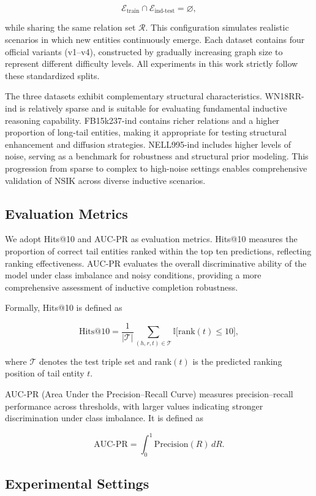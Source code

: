 \documentclass[preprint,12pt]{elsarticle}
\begin{document}
\[
\mathcal{E}_{\text{train}} \cap \mathcal{E}_{\text{ind-test}} = \varnothing,
\]

while sharing the same relation set $\mathcal{R}$. This configuration simulates realistic scenarios in which new entities continuously emerge. Each dataset contains four official variants (v1--v4), constructed by gradually increasing graph size to represent different difficulty levels. All experiments in this work strictly follow these standardized splits.

The three datasets exhibit complementary structural characteristics. WN18RR-ind is relatively sparse and is suitable for evaluating fundamental inductive reasoning capability. FB15k237-ind contains richer relations and a higher proportion of long-tail entities, making it appropriate for testing structural enhancement and diffusion strategies. NELL995-ind includes higher levels of noise, serving as a benchmark for robustness and structural prior modeling. This progression from sparse to complex to high-noise settings enables comprehensive validation of NSIK across diverse inductive scenarios.

\subsection{Evaluation Metrics}

We adopt Hits@10 and AUC-PR as evaluation metrics. Hits@10 measures the proportion of correct tail entities ranked within the top ten predictions, reflecting ranking effectiveness. AUC-PR evaluates the overall discriminative ability of the model under class imbalance and noisy conditions, providing a more comprehensive assessment of inductive completion robustness.

Formally, Hits@10 is defined as

\[
\mathrm{Hits@10}=
\frac{1}{|\mathcal{T}|}
\sum_{(h,r,t)\in \mathcal{T}}
\mathbb{I}\bigl[\mathrm{rank}(t)\le 10\bigr],
\]

where $\mathcal{T}$ denotes the test triple set and $\mathrm{rank}(t)$ is the predicted ranking position of tail entity $t$.

AUC-PR (Area Under the Precision--Recall Curve) measures precision--recall performance across thresholds, with larger values indicating stronger discrimination under class imbalance. It is defined as

\[
\mathrm{AUC\text{-}PR}=\int_{0}^{1} \mathrm{Precision}(R)\, dR.
\]

\subsection{Experimental Settings}
\end{document}
